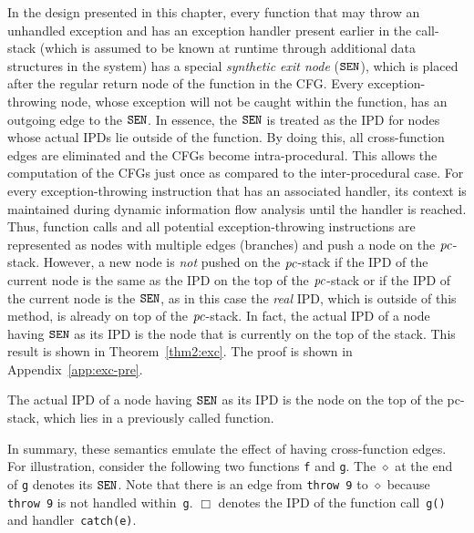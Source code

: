 In the design presented in this chapter, every function that may throw
an unhandled exception and has an exception handler present earlier in
the call-stack (which is assumed to be known at runtime through 
additional data structures in the system) has a special
\emph{synthetic exit node} ($\texttt{SEN}$), which is placed after the regular
return node of the function in the CFG. 
Every exception-throwing node, whose exception will not be caught
within the function, has an outgoing edge to the $\texttt{SEN}$. In essence, the
$\texttt{SEN}$ is treated as the IPD for nodes whose actual IPDs lie outside of
the function. By doing this, all cross-function edges are eliminated
and the CFGs become intra-procedural. This allows the computation of
the CFGs just once as compared to the inter-procedural case. 
For every exc\-ep\-tion-throw\-ing instruction that has an associated
handler, its context is maintained during dynamic information flow
analysis until the handler is reached. 
Thus, function calls and all potential exception-throwing
instructions are represented as nodes with multiple edges (bra\-nches) 
and push a node on the $\mathit{pc}$-stack. However, a new node is \emph{not} 
pushed on the $\mathit{pc}$-stack if the IPD of the current node is the same
as the IPD on the top of the $\mathit{pc}$-stack or if the IPD of the current
node is the $\texttt{SEN}$, as in this case the \emph{real} IPD, which is outside
of this method, is already on top of the $\mathit{pc}$-stack. In fact, the
actual IPD of a node having $\texttt{SEN}$ as its IPD is the node that is
currently on the top of the stack. This result is shown in
Theorem~\ref{thm2:exc}. The proof is shown in Appendix~\ref{app:exc-pre}.

\begin{myThm}\label{thm2:exc}
The actual IPD of a node having $\texttt{SEN}$ as its IPD is the node on
the top of the pc-stack, which lies in a previously called function.
\end{myThm}

In summary, these semantics emulate the effect of having cross-function edges. 
For illustration, consider the following two functions \texttt{f} and
\texttt{g}. The $\diamond$ at the end of \texttt{g} denotes its
$\texttt{SEN}$. Note that there is an edge from \texttt{throw 9} to $\diamond$
because \texttt{throw 9} is not handled within~\texttt{g}. $\Box$
denotes the IPD of the function call~\texttt{g()} and handler~\texttt{catch(e)}.

